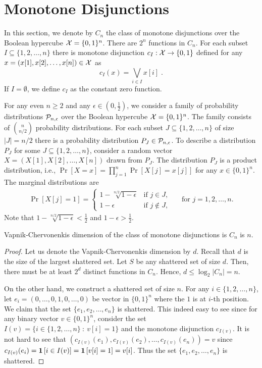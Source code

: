 \section{Monotone Disjunctions}
\label{section:monotone-dijsunctions}

In this section, we denote by $C_n$ the class of monotone disjunctions over the
Boolean hypercube $\X = \{0,1\}^n$. There are $2^n$ functions in $C_n$. For each
subset $I \subseteq \{1,2,\dots,n\}$ there is monotone disjunction $c_I:\X \to
\{0,1\}$ defined for any $x = (x[1],
x[2], \dots, x[n]) \in \X$ as
$$
c_I(x) = \bigvee_{i \in I} x[i] \; .
$$
If $I = \emptyset$, we define $c_I$ as the constant zero function.

For any even $n \ge 2$ and any $\epsilon \in (0,\frac{1}{2})$, we consider a
family of probability distributions $\P_{n,\epsilon}$ over the Boolean hypercube $\X =
\{0,1\}^n$. The family consists of $\binom{n}{n/2}$ probability distributions.
For each subset $J \subseteq \{1,2,\dots,n\}$ of size $|J| = n/2$ there is a
probability distribution $P_J \in \P_{n,\epsilon}$. To describe a distribution $P_J$
for some $J \subseteq \{1,2,\dots,n\}$, consider a random vector $X = (X[1],
X[2], \dots, X[n])$ drawn from $P_J$. The distribution $P_J$ is a product
distribution, i.e., $\Pr[X=x] = \prod_{j=1}^n \Pr[X[j] = x[j]]$ for any $x \in
\{0,1\}^n$. The marginal distributions are
\begin{align*}
\Pr[X[j] = 1] =
\begin{cases}
1 - \sqrt[n/2]{1 - \epsilon}  & \text{if $j \in J$,} \\
1 - \epsilon & \text{if $j \not \in J$,}
\end{cases}
&& \text{for $j=1,2,\dots,n$.}
\end{align*}
Note that $1 - \sqrt[n/2]{1 - \epsilon} < \frac{1}{2}$ and $1 - \epsilon > \frac{1}{2}$.

\begin{proposition}
Vapnik-Chervonenkis dimension of the class of monotone disjunctions is $C_n$ is $n$.
\end{proposition}

\begin{proof}
Let us denote the Vapnik-Chervonenkis dimension by $d$. Recall that $d$ is the
size of the largest shattered set. Let $S$ be any shattered set of size $d$.
Then, there must be at least $2^d$ distinct functions in $C_n$. Hence, $d \le
\log_2 |C_n| = n$.

On the other hand, we construct a shattered set of size $n$. For any $i \in
\{1,2,\dots,n\}$, let $e_i = (0, \dots, 0, 1, 0, \dots, 0)$ be vector in
$\{0,1\}^n$ where the $1$ is at $i$-th position. We claim that the set $\{e_1,
e_2, \dots, e_n\}$ is shattered. This indeed easy to see since for any binary
vector $v \in \{0,1\}^n$, consider the set $I(v) = \{ i \in \{1,2,\dots,n\} ~:~
v[i] = 1 \}$ and the monotone disjunction $c_{I(v)}$. It is not hard to see that
$(c_{I(v)}(e_1), c_{I(v)}(e_2), \dots, c_{I(v)}(e_n)) = v$ since $c_{I(v)}(e_i) =
\indicator{i \in I(v)} = \indicator{v[i] = 1} = v[i]$. Thus the set
$\{e_1, e_2, \dots, e_n\}$ is shattered.
\end{proof}

